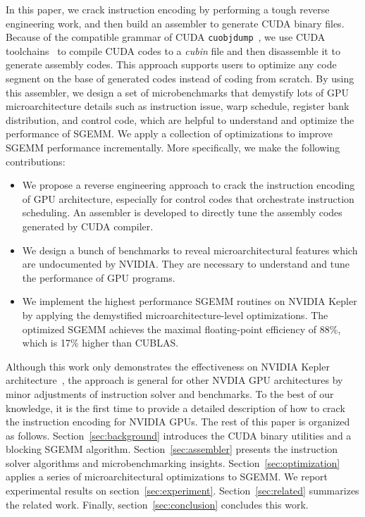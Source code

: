 In this paper, we crack instruction encoding by performing a tough reverse engineering work, and then build an assembler to generate CUDA binary files. Because of the compatible grammar of CUDA {\tt cuobjdump}~\cite{cubin2015util}, we use CUDA toolchains~\cite{nvcc} to compile CUDA codes to a {\em cubin} file and then disassemble it to generate assembly codes. This approach supports users to optimize any code segment on the base of generated codes instead of coding from scratch. By using this assembler, we design a set of microbenchmarks that demystify lots of GPU microarchitecture details such as instruction issue, warp schedule, register bank distribution, and control code, which are helpful to understand and optimize the performance of SGEMM. We apply a collection of optimizations to improve SGEMM performance incrementally. More specifically, we make the following contributions:
\begin{itemize}
\item We propose a reverse engineering approach to crack the instruction encoding of GPU architecture, especially for control codes that orchestrate instruction scheduling. An assembler is developed to directly tune the assembly codes generated by CUDA compiler.
\item We design a bunch of benchmarks to reveal microarchitectural features which are undocumented by NVIDIA. They are necessary to understand and tune the performance of GPU programs.
\item We implement the highest performance SGEMM routines on NVIDIA Kepler by applying the demystified microarchitecture-level optimizations. The optimized SGEMM achieves the maximal floating-point efficiency of 88\%, which is 17\% higher than CUBLAS.
\end{itemize}

Although this work only demonstrates the effectiveness on NVIDIA Kepler architecture~\cite{gk110}, the approach is general for other NVDIA GPU architectures by minor adjustments of instruction solver and benchmarks. To the best of our knowledge, it is the first time to provide a detailed description of how to crack the instruction encoding for NVIDIA GPUs. The rest of this paper is organized as follows. Section~\ref{sec:background} introduces the CUDA binary utilities and a blocking SGEMM algorithm. Section~\ref{sec:assembler} presents the instruction solver algorithms and microbenchmarking insights. Section~\ref{sec:optimization} applies a series of microarchitectural optimizations to SGEMM. We report experimental results on section~\ref{sec:experiment}. Section~\ref{sec:related} summarizes the related work. Finally, section~\ref{sec:conclusion} concludes this work. 
